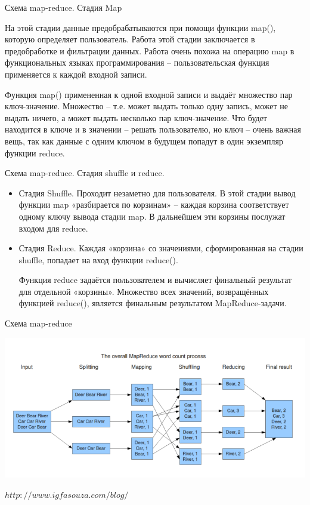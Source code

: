 \documentclass[10pt,pdf,hyperref={unicode}]{beamer}
\begin{document}
\begin{frame}{Схема map-reduce. Стадия Map} 

    На этой стадии данные предобрабатываются при помощи функции map(), которую определяет пользователь. 
    Работа этой стадии заключается в предобработке и фильтрации данных. 
    Работа очень похожа на операцию map в функциональных языках программирования – 
    пользовательская функция применяется к каждой входной записи.

Функция map() примененная к одной входной записи и 
выдаёт множество пар ключ-значение. Множество – т.е. может выдать только одну запись, 
может не выдать ничего, а может выдать несколько пар ключ-значение. 
Что будет находится в ключе и в значении – решать пользователю, 
но ключ – очень важная вещь, 
так как данные с одним ключом в будущем попадут в один экземпляр функции reduce.

\end{frame}

\begin{frame}{Схема map-reduce. Стадия shuffle и  reduce.} 


\begin{itemize}

\item   Стадия Shuffle. Проходит незаметно для пользователя. В этой стадии вывод функции map «разбирается по корзинам» – каждая корзина соответствует одному ключу вывода 
стадии map. В дальнейшем эти корзины послужат входом для reduce.


\item   Стадия Reduce. Каждая «корзина» со значениями, сформированная на стадии shuffle, попадает на вход функции reduce().

Функция reduce задаётся пользователем и вычисляет финальный результат для отдельной «корзины».
Множество всех значений, возвращённых функцией reduce(), является финальным результатом MapReduce-задачи. 

\end{itemize}

\end{frame}

\begin{frame}{Схема map-reduce}

\includegraphics[scale=0.3]{images/ris_01.png}

$http://www.igfasouza.com/blog/$

\end{frame}
\end{document}
